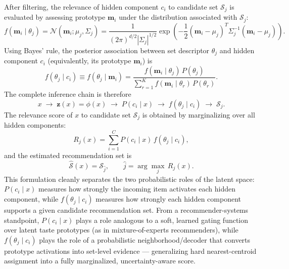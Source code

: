 \documentclass{article}
\theoremstyle{plain}
\theoremstyle{definition}
\theoremstyle{remark}
\begin{document}
After filtering, the relevance of hidden component $c_i$ to candidate set $\mathcal{S}_j$ is evaluated by assessing prototype $\mathbf{m}_i$ under the distribution associated with $\mathcal{S}_j$:
\begin{equation}
	\label{eq:likelihood_prototype}
	f(\mathbf{m}_i \mid \theta_j) = \mathcal{N}(\mathbf{m}_i; \mu_j, \Sigma_j) = \frac{1}{(2\pi)^{d/2} |\Sigma_j|^{1/2}} \exp\!\left( -\frac{1}{2} (\mathbf{m}_i - \mu_j)^T \Sigma_j^{-1} (\mathbf{m}_i - \mu_j) \right).
\end{equation}
Using Bayes' rule, the posterior association between set descriptor $\theta_j$ and hidden component $c_i$ (equivalently, its prototype $\mathbf{m}_i$) is
\begin{equation}
	\label{eq:posterior_set}
	f(\theta_j \mid c_i) \equiv f(\theta_j \mid \mathbf{m}_i) = \frac{f(\mathbf{m}_i \mid \theta_j) \, P(\theta_j)}{\sum_{r=1}^{K} f(\mathbf{m}_i \mid \theta_r) \, P(\theta_r)}.
\end{equation}
The complete inference chain is therefore
\[
x \;\longrightarrow\; \mathbf{z}(x) = \phi(x) \;\longrightarrow\; P(c_i \mid x) \;\longrightarrow\; f(\theta_j \mid c_i) \;\longrightarrow\; \mathcal{S}_j.
\]
The relevance score of $x$ to candidate set $\mathcal{S}_j$ is obtained by marginalizing over all hidden components:
\begin{equation}
	\label{eq:relevance_score}
	R_j(x) = \sum_{i=1}^{C} P(c_i \mid x) \, f(\theta_j \mid c_i),
\end{equation}
and the estimated recommendation set is
\begin{equation}
	\label{eq:estimated_set}
	\widehat{\mathcal{S}}(x) = \mathcal{S}_{\widehat{j}}, \qquad \widehat{j} = \arg\max_{j} \, R_j(x).
\end{equation}
This formulation cleanly separates the two probabilistic roles of the latent space: $P(c_i \mid x)$ measures how strongly the incoming item activates each hidden component, while $f(\theta_j \mid c_i)$ measures how strongly each hidden component supports a given candidate recommendation set. From a recommender-systems standpoint, $P(c_i \mid x)$ plays a role analogous to a soft, learned gating function over latent taste prototypes (as in mixture-of-experts recommenders), while $f(\theta_j \mid c_i)$ plays the role of a probabilistic neighborhood/decoder that converts prototype activations into set-level evidence — generalizing hard nearest-centroid assignment into a fully marginalized, uncertainty-aware score.
\end{document}

